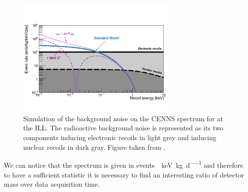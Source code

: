 \begin{figure}
\centering
\includegraphics[width=0.7\textwidth]{Figures/Introduction/cenns_spectrum_ill.pdf}
\caption{Simulation of the background noise on the CENNS spectrum for \Ricochet{} at the ILL. The radioactive background noise is represented as its two components inducing electronic recoils in light grey and inducing nuclear recoils in dark gray. Figure taken from \cite{Billard:2018jnl}.}
\label{fig:cenns-new-physics}
\end{figure}

We can notice that the spectrum is given in \si{events \per \kilo\eV \per \kg \per \day} and therefore to have a sufficient statistic it is necessary to find an interesting ratio of detector mass over data acquisition time.


